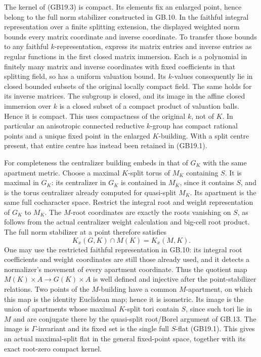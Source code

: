 \documentclass[
  11pt,
]{article}
\begin{document}
The kernel of (GB19.3) is compact. Its elements fix an enlarged point,
hence belong to the full norm stabilizer constructed in GB.10. In the
faithful integral representation over a finite splitting extension, the
displayed weighted norm bounds every matrix coordinate and inverse
coordinate. To transfer those bounds to any faithful
\(k\)-representation, express its matrix entries and inverse entries as
regular functions in the first closed matrix immersion. Each is a
polynomial in finitely many matrix and inverse coordinates with fixed
coefficients in that splitting field, so has a uniform valuation bound.
Its \(k\)-values consequently lie in closed bounded subsets of the
original locally compact field. The same holds for its inverse matrices.
The subgroup is closed, and its image in the affine closed immersion
over \(k\) is a closed subset of a compact product of valuation balls.
Hence it is compact. This uses compactness of the original \(k\), not of
\(K\). In particular an anisotropic connected reductive \(k\)-group has
compact rational points and a unique fixed point in the enlarged
\(K\)-building. With a split centre present, that entire centre has
instead been retained in (GB19.1).

For completeness the centralizer building embeds in that of \(G_K\) with
the same apartment metric. Choose a maximal \(K\)-split torus of \(M_K\)
containing \(S\). It is maximal in \(G_K\): its centralizer in \(G_K\)
is contained in \(M_K\), since it contains \(S\), and is the torus
centralizer already computed for quasi-split \(M_K\). Its apartment is
the same full cocharacter space. Restrict the integral root and weight
representation of \(G_K\) to \(M_K\). The \(M\)-root coordinates are
exactly the roots vanishing on \(S\), as follows from the actual
centralizer weight calculation and big-cell root product. The full norm
stabilizer at a point therefore satisfies \[
                K_x(G,K)\cap M(K)=K_x(M,K).                 \tag{GB19.4}
\] One may use the restricted faithful representation in GB.10: its
integral root coefficients and weight coordinates are still those
already used, and it detects a normalizer's movement of every apartment
coordinate. Thus the quotient map \(M(K)\times A\to G(K)\times A\) is
well defined and injective after the point-stabilizer relations. Two
points of the \(M\)-building have a common \(M\)-apartment, on which
this map is the identity Euclidean map; hence it is isometric. Its image
is the union of apartments whose maximal \(K\)-split tori contain \(S\),
since such tori lie in \(M\) and are conjugate there by the quasi-split
root/Borel argument of GB.13. The image is \(\Gamma\)-invariant and its
fixed set is the single full \(S\)-flat (GB19.1). This gives an actual
maximal-split flat in the general fixed-point space, together with its
exact root-zero compact kernel.
\end{document}
